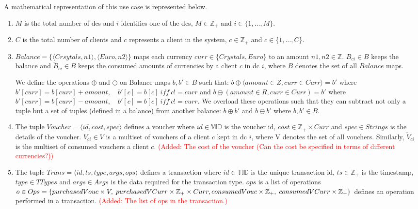 A mathematical representation of this use case is represented below.
\begin{enumerate}
	\item $M$ is the total number of \glspl{dc} and $i$ identifies one of the \glspl{dc}, $M \in \mathbb{Z}_{+}$ and $i \in \{1,\dots, M\}$.

	\item $C$ is the total number of clients and $c$ represents a client in the system, $c \in \mathbb{Z}_{+}$ and $c \in \{1,\dots, C\}$.

	\item $Balance = \{ \langle Crsytals, n1 \rangle, \langle Euro, n2 \rangle \}$ maps each currency $curr \in \{Crystals, Euro\}$ to an amount $n1, n2 \in \mathbb{Z}$. $B_{ci} \in B$ keeps the balance and $\widetilde{B}_{ci} \in B$ keeps the consumed amounts of currencies by a client $c$ in \gls{dc} $i$, where $B$ denotes the set of all $Balance$ maps.

	We define the operations $\oplus$ and $\ominus$ on Balance maps $b, b' \in B$ such that: $b \oplus \langle amount \in Z, curr \in Curr \rangle = b'$ where $b'[curr] = b[curr] + amount$,  ~  $b'[c] = b[c]  ~  iff  ~  c != curr$ and $b \ominus(amount \in R, curr \in Curr) = b'$ where $b'[curr] = b[curr] - amount$,  ~  $b'[c] = b[c]  ~  iff  ~  c != curr$. We overload these operations such that they can subtract not only a tuple but a set of tuples (defined in a balance) from another balance: $b \oplus b'$ and $b \ominus b'$ where $b, b' \in B$.  
	
	\item The tuple $Voucher = \langle id, cost, spec \rangle$ defines a voucher where $id \in \mathbb{VID}$  is the voucher id, $cost \in \mathbb{Z}_{+} \times Curr$ and $spec \in Strings$ is the details of the voucher. $V_{ci} \in V$ is a multiset of vouchers of a client $c$ kept in \gls{dc} $i$, where V denotes the set of all vouchers. Similarly, $\widetilde{V}_{ci}$ is the multiset of consumed vouchers a client $c$.
	\textcolor{red}{(Added: The cost of the voucher (Can the cost be specified in terms of different currencies?))}
	
	\item The tuple $Trans = \langle id, ts, type, args, ops \rangle$ defines a transaction where $id \in \mathbb{TID}$ is the unique transaction id, $ts \in \mathbb{Z}_{+}$ is the timestamp, $type \in TTypes$ and $args \in Args$ is the data required for the transaction type.  $ops$ is a list of operations $o \in Ops = \{ purchasedVouc \times V, \; purchasedVCurr \times \mathbb{Z}_{+} \times Curr, \\ consumedVouc \times \mathbb{Z}_{+}, \; consumedVCurr \times \mathbb{Z}_{+} \}$ defines an operation performed in a transaction. \textcolor{red}{(Added: The list of ops in the transaction.)}
 	

\end{enumerate}
